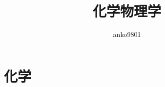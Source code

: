 \documentclass[a4paper,11pt]{jlreq}
\title{化学物理学}
\author{anko9801}
\begin{document}
\maketitle
\tableofcontents
\clearpage

\section{化学}
\end{document}
